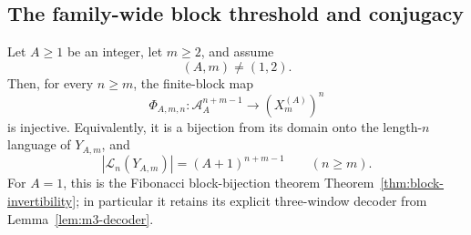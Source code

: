 \subsection{The family-wide block threshold and conjugacy}

\begin{theorem}
\label{thm:metallic-family-block-bijection}
Let $A\ge1$ be an integer, let $m\ge2$, and assume
\[
(A,m)\ne(1,2).
\]
Then, for every $n\ge m$, the finite-block map
\[
\Phi_{A,m,n}:\mathcal A_A^{n+m-1}\longrightarrow (X_m^{(A)})^n
\]
is injective.  Equivalently, it is a bijection from its domain onto the
length-$n$ language of $Y_{A,m}$, and
\begin{equation}\label{eq:metallic-block-count}
|\mathcal L_n(Y_{A,m})|=(A+1)^{n+m-1}\qquad(n\ge m).
\end{equation}
For $A=1$, this is the Fibonacci block-bijection theorem
Theorem~\ref{thm:block-invertibility}; in particular it retains its explicit
three-window decoder from Lemma~\ref{lem:m3-decoder}.
\end{theorem}

